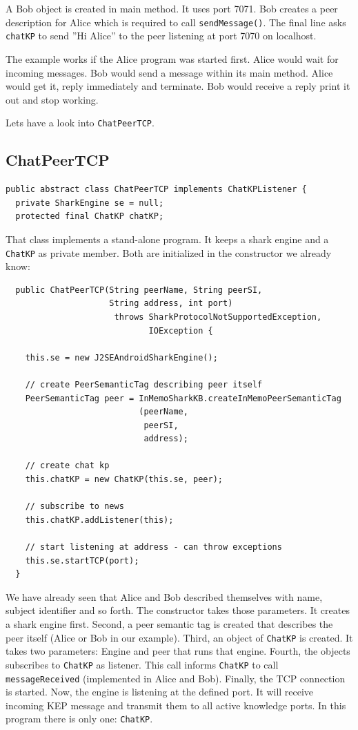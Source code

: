 {A Bob object is created in main method. It uses port 7071. Bob creates a peer description for Alice which is required to call {\tt sendMessage()}. The final line asks {\tt chatKP} to send ''Hi Alice'' to the peer listening at port 7070 on localhost. 

The example works if the Alice program was started first. Alice would wait for incoming messages. Bob would send a message within its main method. Alice would get it, reply immediately and terminate. Bob would receive a reply print it out and stop working.

Lets have a look into {\tt ChatPeerTCP}.

\subsection{ChatPeerTCP}
\begin{verbatim}
public abstract class ChatPeerTCP implements ChatKPListener {
  private SharkEngine se = null;
  protected final ChatKP chatKP;
\end{verbatim}

That class implements a stand-alone program. It keeps a shark engine
and a {\tt ChatKP} as private member. Both are initialized in the
constructor we already know:

\begin{verbatim}
  public ChatPeerTCP(String peerName, String peerSI, 
                     String address, int port) 
                      throws SharkProtocolNotSupportedException, 
                             IOException {

    this.se = new J2SEAndroidSharkEngine();

    // create PeerSemanticTag describing peer itself
    PeerSemanticTag peer = InMemoSharkKB.createInMemoPeerSemanticTag
                           (peerName,    
                            peerSI, 
                            address);

    // create chat kp
    this.chatKP = new ChatKP(this.se, peer);

    // subscribe to news
    this.chatKP.addListener(this);

    // start listening at address - can throw exceptions
    this.se.startTCP(port);
  }
\end{verbatim}
We have already seen that Alice and Bob described themselves with
name, subject identifier and so forth. The constructor takes those parameters.
It creates a shark engine first. Second, a peer semantic tag is created that describes the peer itself (Alice or Bob in our example). Third, an object of
{\tt ChatKP} is created. It takes two parameters: Engine and peer that runs that
engine. Fourth, the objects subscribes to {\tt ChatKP} as listener. This call informs {\tt ChatKP} to call {\tt messageReceived} (implemented in Alice and 
Bob). Finally, the TCP connection is started. Now, the engine is listening at the defined port. It will receive incoming KEP message and transmit them to all active knowledge ports. In this program there is only one: {\tt ChatKP}.

}
